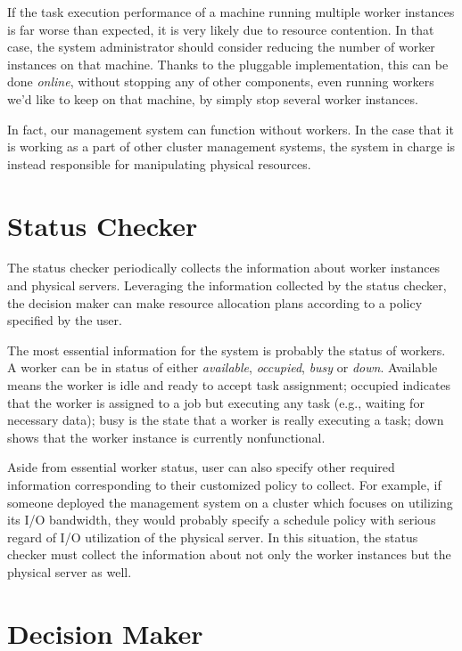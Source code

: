 If the task execution performance of a machine running multiple worker
instances is far worse than expected, it is very likely due to resource
contention.  In that case, the system administrator should consider
reducing the number of worker instances on that machine.  Thanks to the
pluggable implementation, this can be done \emph{online}, without
stopping any of other components, even running workers we'd like to keep
on that machine, by simply stop several worker instances.

In fact, our management system can function without workers.  In the
case that it is working as a part of other cluster management systems,
the system in charge is instead responsible for manipulating physical
resources.

\section{Status Checker}

The status checker periodically collects the information about worker
instances and physical servers.  Leveraging the information collected
by the status checker, the decision maker can make resource allocation
plans according to a policy specified by the user.

The most essential information for the system is probably the status of
workers.  A worker can be in status of either \emph{available},
\emph{occupied}, \emph{busy} or \emph{down}.  Available means the worker
is idle and ready to accept task assignment; occupied indicates that the
worker is assigned to a job but executing any task (e.g., waiting for
necessary data); busy is the state that a worker is really executing a
task; down shows that the worker instance is currently nonfunctional. 

Aside from essential worker status, user can also specify other required
information corresponding to their customized policy to collect.  For
example, if someone deployed the management system on a cluster which
focuses on utilizing its I/O bandwidth, they would probably specify a
schedule policy with serious regard of I/O utilization of the physical
server.  In this situation, the status checker must collect the
information about not only the worker instances but the physical server
as well.

\section{Decision Maker}


